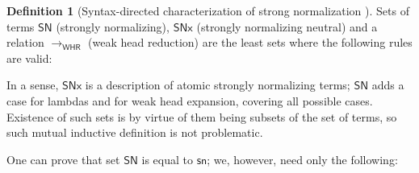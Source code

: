 \documentclass{article}
\theoremstyle{definition}
\newtheorem{definition}{Definition}
\theoremstyle{remark}
\begin{document}
\begin{definition}[Syntax-directed characterization
    of strong normalization ]
    Sets of terms $\mathsf{SN}$ (strongly normalizing),
    $\mathsf{SNx}$ (strongly normalizing neutral) and a
    relation $\to_\mathsf{WHR}$ (weak head reduction)
    are the least sets where the following rules are
    valid:
\end{definition}

In a sense, $\mathsf{SNx}$ is a description of atomic
strongly normalizing terms; $\mathsf{SN}$ adds a case
for lambdas and for weak head expansion, covering all
possible cases. Existence of such sets is by virtue of
them being subsets of the set of terms, so such mutual
inductive definition is not problematic.

One can prove that set $\mathsf{SN}$ is equal to
$\mathsf{sn}$; we, however, need only the following:
\end{document}
